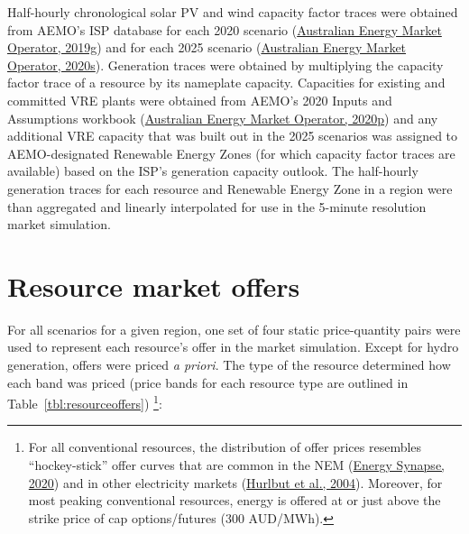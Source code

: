 \documentclass[12pt,a4paper,]{report}
\begin{document}
Half-hourly chronological solar PV and wind capacity factor traces were
obtained from AEMO's ISP database for each 2020 scenario
(\protect\hyperlink{ref-australianenergymarketoperator2020DraftISP2019}{Australian
Energy Market Operator, 2019g}) and for each 2025 scenario
(\protect\hyperlink{ref-australianenergymarketoperator2020ISPSolar2020}{Australian
Energy Market Operator, 2020s}). Generation traces were obtained by
multiplying the capacity factor trace of a resource by its nameplate
capacity. Capacities for existing and committed VRE plants were obtained
from AEMO's 2020 Inputs and Assumptions workbook
(\protect\hyperlink{ref-australianenergymarketoperator2020InputsAssumptions2020}{Australian
Energy Market Operator, 2020p}) and any additional VRE capacity that was
built out in the 2025 scenarios was assigned to AEMO-designated
Renewable Energy Zones (for which capacity factor traces are available)
based on the ISP's generation capacity outlook. The half-hourly
generation traces for each resource and Renewable Energy Zone in a
region were than aggregated and linearly interpolated for use in the
5-minute resolution market simulation.

\hypertarget{resource-market-offers}{%
\section{Resource market offers}\label{resource-market-offers}}

For all scenarios for a given region, one set of four static
price-quantity pairs were used to represent each resource's offer in the
market simulation. Except for hydro generation, offers were priced
\emph{a priori}. The type of the resource determined how each band was
priced (price bands for each resource type are outlined in
Table~\ref{tbl:resourceoffers}) \footnote{For all conventional
  resources, the distribution of offer prices resembles ``hockey-stick''
  offer curves that are common in the NEM
  (\protect\hyperlink{ref-energysynapseDemandResponseNational2020}{Energy
  Synapse, 2020}) and in other electricity markets
  (\protect\hyperlink{ref-hurlbutProtectingMarketHockey2004}{Hurlbut et
  al., 2004}). Moreover, for most peaking conventional resources, energy
  is offered at or just above the strike price of cap options/futures
  (300 AUD/MWh).}:
\end{document}
